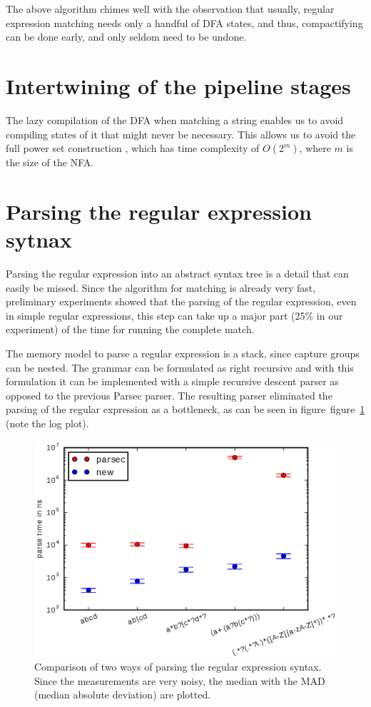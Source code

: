 \documentclass[11pt,a4paper,twoside,openright]{Thesis}
\theoremstyle{definition}
\newcommand{\Figref}[1]{figure~\ref{fig:#1}}
\newcommand{\figlabel}[1]{\label{fig:#1}}
\newcommand{\seclabel}[1]{\label{sec:#1}}
\begin{document}
The above algorithm chimes well with the observation that usually,
regular expression matching needs only a handful of DFA states, and thus,
compactifying can be done early, and only seldom need to be undone.

\section{Intertwining of the pipeline stages}
The lazy compilation of the DFA when matching a string enables us
to avoid compiling states of it that might never be necessary. This
allows us to avoid the full power set construction \cite{Sips05a}, which has 
time complexity of $O(2^m)$, where $m$ is the size of the NFA.

\section{Parsing the regular expression sytnax}  \seclabel{regex-syntax}
Parsing the regular expression into an abstract syntax tree is a detail that
can easily be missed. Since the algorithm for matching is already very fast,
preliminary experiments showed that the parsing of the regular expression, even
in simple regular expressions, this step can take up a major part (25\% in our
experiment) of the time for running the complete match.

The memory model to parse a regular expression is a stack, since capture groups
can be nested. The grammar can be formulated as right recursive and with this
formulation it can be implemented with a simple recursive descent parser as 
opposed to the previous Parsec parser. The resulting parser eliminated the 
parsing of the regular expression as a bottleneck, as can be seen in
figure~\Figref{regex-syntax-parsing} (note the log plot).

\begin{figure}
  \includegraphics[width=\linewidth]{graphs/logplot-parserspeed-robust}

  \caption[Regular expression grammar parse time]{\figlabel{regex-syntax-parsing}Comparison of two ways of parsing the
regular expression syntax. Since the measurements are very noisy, the median 
with the MAD (median absolute deviation) are plotted.}
\end{figure}
\end{document}
